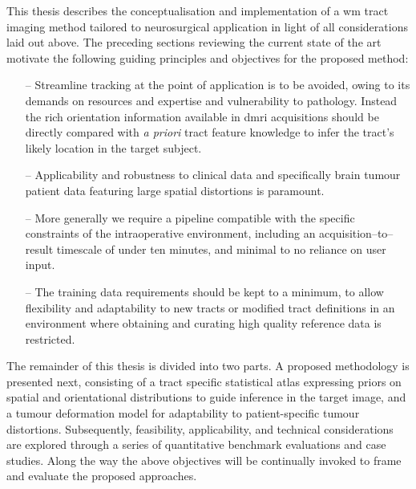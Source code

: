 This thesis describes the conceptualisation and implementation of a \gls{wm} tract imaging method tailored to neurosurgical application in light of all considerations laid out above.
The preceding sections reviewing the current state of the art motivate the following guiding principles and objectives for the proposed method:
\begin{itemize}[itemsep=0pt,parsep=0pt]
\item[--] Streamline tracking at the point of application is to be avoided, owing to its demands on resources and expertise and vulnerability to pathology.
Instead the rich orientation information available in \gls{dmri} acquisitions should be directly compared with \textit{a priori} tract feature knowledge to infer the tract's likely location in the target subject.
\item[--] Applicability and robustness to clinical data and specifically brain tumour patient data featuring large spatial distortions is paramount.
\item[--] More generally we require a pipeline compatible with the specific constraints of the intraoperative environment, including an acquisition--to--result timescale of under ten minutes, and minimal to no reliance on user input.
\item[--] The training data requirements should be kept to a minimum, to allow flexibility and adaptability to new tracts or modified tract definitions in an environment where obtaining and curating high quality reference data is restricted.
\end{itemize}

The remainder of this thesis is divided into two parts.
A proposed methodology is presented next, consisting of a tract specific statistical atlas expressing priors on spatial and orientational distributions to guide inference in the target image, and a tumour deformation model for adaptability to patient-specific tumour distortions.
Subsequently, feasibility, applicability, and technical considerations are explored through a series of quantitative benchmark evaluations and case studies.
Along the way the above objectives will be continually invoked to frame and evaluate the proposed approaches.
